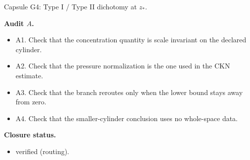 \documentclass[11pt]{amsart}
\newcommand{\capsulefield}[1]{\par\smallskip\noindent\textbf{#1.}\ }
\begin{document}
\begin{proofcapsule}{Capsule G4: Type I / Type II dichotomy at $z_*$.}
  \capsulefield{Audit \(A\)}
  \begin{itemize}[leftmargin=1.8em]
  \item A1. Check that the concentration quantity is scale invariant on the declared cylinder.
  \item A2. Check that the pressure normalization is the one used in the CKN estimate.
  \item A3. Check that the branch reroutes only when the lower bound stays away from zero.
  \item A4. Check that the smaller-cylinder conclusion uses no whole-space data.
  \end{itemize}
  \capsulefield{Closure status}
  \begin{itemize}[leftmargin=1.8em]
  \item verified (routing).
  \end{itemize}
\end{proofcapsule}
\end{document}
